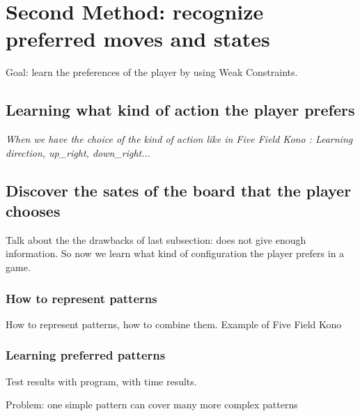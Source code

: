 \documentclass[12pt,twoside]{report}
\begin{document}
\section{Second Method: recognize preferred moves and states}

Goal: learn the preferences of the player by using Weak Constraints.

\subsection{Learning what kind of action the player prefers}

\emph{When we have the choice of the kind of action like in Five Field Kono : Learning  direction, up\_right, down\_right... }


\subsection{Discover the sates of the board that the player chooses}

Talk about the the drawbacks of last subsection: does not give enough information. So now we learn what kind of configuration the player prefers in a game. 


\subsubsection{How to represent patterns}

How to represent patterns, how to combine them. Example of Five Field Kono

% 

\subsubsection{Learning preferred patterns}

Test results with program, with time results.

Problem: one simple pattern can cover many more complex patterns

\end{document}
